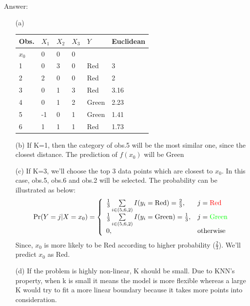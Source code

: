 \documentclass[12pt,a4paper]{article}%
\theoremstyle{definition}
\theoremstyle{plain}
\numberwithin{equation}{section}
\begin{document}
\begin{framed}
Answer:
    \begin{enumerate}
        \item[(a)]
            \begin{tabular}{llllll}
            Obs.  & $X_{1}$    & $X_{2}$     & $X_{3}$  & $Y$ & Euclidean\\
            \toprule
            $x_{0}$ & 0 & 0 & 0 & &  \\
            \toprule
            1 & 0 & 3 & 0 & Red & 3 \\
            2 & 2 & 0 & 0 & Red & 2 \\
            3 & 0 & 1 & 3 & Red & 3.16 \\
            4 & 0 & 1 & 2 & Green & 2.23 \\
            5 & -1 & 0 & 1 & Green & 1.41 \\
            6 & 1 & 1 & 1 & Red & 1.73 \\
            \bottomrule
            \end{tabular}
        \item[(b)] If K=1, then the category of obs.5 will be the most similar one, since the closest distance. The prediction of $\hat{f}(x_{0})$ will be Green

        \item[(c)] If K=3, we'll choose the top 3 data points which are closest to $x_{0}$. In this case, obs.5, obs.6 and obs.2 will be selected. The probability can be illustrated as below:
            \begin{gather}
            {\rm Pr}(Y=j|X=x_{0}) = \left\{
            \begin{array}{ll}
            \frac{1}{3}\sum\limits_{i \in (5,6,2)}I(y_{i}=\mbox{Red}) = \frac{2}{3}, & j = \mbox{\color{red}Red}\\
            \frac{1}{3}\sum\limits_{i \in (5,6,2)}I(y_{i}=\mbox{Green})= \frac{1}{3}, & j = \mbox{\color{green}Green}\\
            0, & \mbox{otherwise} \\
            \end{array} \right.
            \end{gather}
            Since, $x_{0}$ is more likely to be Red according to higher probability ($\frac{2}{3}$). We'll predict $x_{0}$ as Red.
        \item[(d)] If the problem is highly non-linear, K should be small. Due to KNN's property, when k is small it means the model is more flexible
                   whereas a large K would try to fit a more linear boundary because it takes more points into consideration.
    \end{enumerate}
\end{framed}
\end{document}
